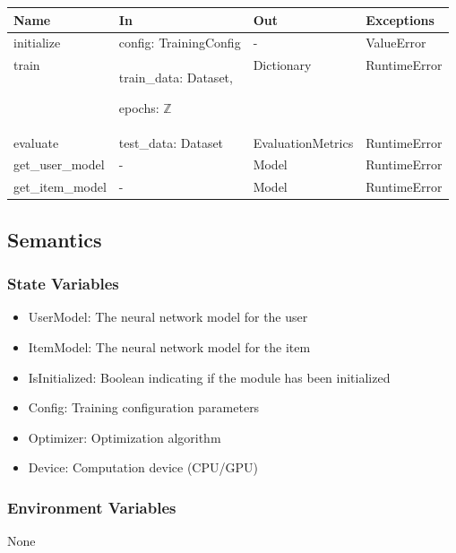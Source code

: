 \documentclass[12pt, titlepage]{article}
\begin{document}
\begin{center}
  \begin{tabular}{p{3cm} p{4cm} p{4cm} p{2cm}}
  \hline
  \textbf{Name} & \textbf{In} & \textbf{Out} & \textbf{Exceptions} \\
  \hline
  initialize & config: TrainingConfig & - & ValueError \\
  \hline
  train & train\_data: Dataset,
  
  epochs: $\mathbb{Z}$
  
  & Dictionary & RuntimeError \\
  \hline
  evaluate & test\_data: Dataset
  
  & EvaluationMetrics & RuntimeError \\
  \hline
  get\_user\_model & 
  
  - &  Model & RuntimeError \\
  \hline
  get\_item\_model & 
  
  - &  Model & RuntimeError \\
  \hline
  \end{tabular}
  \end{center}

\subsection{Semantics}

\subsubsection{State Variables}
\begin{itemize}
  \item UserModel: The neural network model for the user
  \item ItemModel: The neural network model for the item 
  \item IsInitialized: Boolean indicating if the module has been initialized
  \item Config: Training configuration parameters
  \item Optimizer: Optimization algorithm
  \item Device: Computation device (CPU/GPU)
\end{itemize}

\subsubsection{Environment Variables}

None
\end{document}
